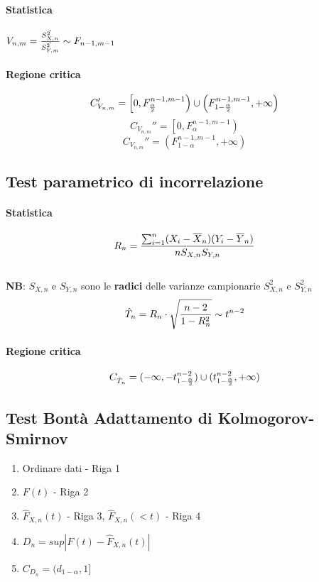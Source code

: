\documentclass[12pt]{article}
\begin{document}
    \paragraph{Statistica} $V_{n, m} = {\hat{S^2_{X,n}} \over \hat{S^2_{Y,m}}} \sim F_{n-1, m-1}$
    \paragraph{Regione critica}
    $$C_{V_{n,m}}' = \left[0, F_{\alpha \over 2}^{n-1,m-1} \right) \cup \left(F_{1 - {\alpha \over 2}}^{n-1,m-1}, +\infty\right)$$ 
    $$C_{V_{n,m}}'' = \left[0, F_{\alpha}^{n-1,m-1} \right)$$
    $$C_{V_{n,m}}'' = \left(F_{1 - {\alpha}}^{n-1,m-1}, +\infty\right)$$
    \subsection{Test parametrico di incorrelazione }
    \paragraph{Statistica} $$R_n = {{\sum_{i=1}^n(X_i - \overline{X}_n)(Y_i - \overline{Y}_n)}\over{nS_{X,n}S_{Y,n}}}$$
    \\\textbf{NB}: $S_{X,n}$ e $S_{Y,n}$ sono le \textbf{radici} delle varianze campionarie $S_{X,n}^2$ e $S_{Y,n}^2$
    $$\hat{T}_n = R_n \cdot \sqrt{{n-2}\over{1- R_n^2}} \sim t^{n-2}$$
    \paragraph{Regione critica}
    $$C_{\hat{T}_n} = (-\infty, -t_{1-{\alpha \over 2}}^{n-2}) \cup (t_{1-{\alpha \over 2}}^{n-2}, +\infty)$$

    \newpage
    \subsection{Test Bontà Adattamento di Kolmogorov-Smirnov}
    \begin{enumerate}
        \item Ordinare dati - Riga 1
        \item $F(t)$ - Riga 2
        \item $\hat{F}_{X, n}(t)$ - Riga 3, $\hat{F}_{X, n}(< t)$ - Riga 4
        \item $D_n = sup|F(t) - \hat{F}_{X, n}(t)|$
        \item $C_{D_n} = (d_{1-\alpha}, 1]$
    \end{enumerate}
\end{document}

